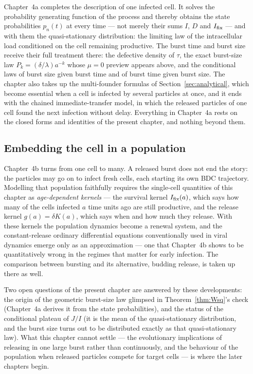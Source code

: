 Chapter~4a completes the description of one infected cell. It solves the
probability generating function of the process and thereby obtains the state
probabilities $p_n(t)$ at every time --- not merely their sums $I$, $D$ and
$I_{\mathrm{fix}}$ --- and with them the quasi-stationary distribution: the limiting law
of the intracellular load conditioned on the cell remaining productive. The
burst time and burst size receive their full treatment there: the defective
density of $\tau$, the exact burst-size law $P_k=(\delta/\lambda)a^{-k}$ whose
$\mu=0$ preview appears above, and the conditional laws of burst size given
burst time and of burst time given burst size. The chapter also takes up the
multi-founder formulas of Section~\ref{sec:analytical}, which become essential
when a cell is infected by several particles at once, and it ends with the
chained immediate-transfer model, in which the released particles of one cell
found the next infection without delay. Everything in Chapter~4a rests on the
closed forms and identities of the present chapter, and nothing beyond them.

\subsection*{Embedding the cell in a population}

Chapter~4b turns from one cell to many. A released burst does not end the
story: the particles may go on to infect fresh cells, each starting its own
BDC trajectory. Modelling that population faithfully requires the
single-cell quantities of this chapter as \textit{age-dependent kernels} ---
the survival kernel $I_{\mathrm{fix}}(a)$, which says how many of the cells infected $a$
time units ago are still productive, and the release kernel $g(a)=\delta K(a)$,
which says when and how much they release. With these kernels the population
dynamics become a renewal system, and the constant-release ordinary
differential equations conventionally used in viral dynamics emerge only as an
approximation --- one that Chapter~4b shows to be quantitatively wrong in the
regimes that matter for early infection. The comparison between bursting and
its alternative, budding release, is taken up there as well.

Two open questions of the present chapter are answered by these developments:
the origin of the geometric burst-size law glimpsed in
Theorem~\ref{thm:Wsq}'s check (Chapter~4a derives it from the state
probabilities), and the status of the conditional plateau of $J/I$ (it is the
mean of the quasi-stationary distribution, and the burst size turns out to be
distributed exactly as that quasi-stationary law). What this chapter cannot
settle --- the evolutionary implications of releasing in one large burst
rather than continuously, and the behaviour of the population when released
particles compete for target cells --- is where the later chapters begin.
